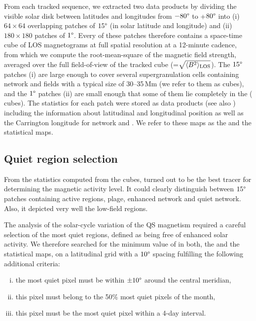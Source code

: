 \documentclass{aa}
\begin{document}
From each tracked sequence, we extracted two data products by dividing the visible solar disk  between latitudes and longitudes from $-80\degree$ to +$80\degree$ into (i) $64\times 64$  overlapping patches of $15\degree$ (in solar latitude and longitude)  and (ii) $180\times 180$ patches of $1\degree$.
Every of these patches therefore contains a space-time cube of LOS magnetograms at full spatial resolution at a 12-minute cadence,
from which we 
compute the 
root-mean-square of the magnetic field strength, averaged over the full field-of-view of the tracked cube (\brms{}=$\sqrt{\langle B^2\rangle_{\rm LOS}}$).
The $15\degree$ patches (i) are large enough to cover several supergranulation cells containing network and \IN{} fields \cite[]{2010LRSP....7....2R} with a typical size of 30--35\,Mm (we refer to them as \nw{} cubes), and the $1\degree$ patches (ii) are small enough that some of them lie completely in the \IN{} (\inw{} cubes). 
The statistics for each patch were stored as data products (see also ) including the information about 
latitudinal and longitudinal position as well as the Carrington 
longitude for network and \IN{}. We refer to these maps as the \nw{} and the \inw{} statistical maps.

\subsection{Quiet region selection\label{quietregion}}

From the 
statistics computed from the cubes, 
\brms{}
turned out to be the best tracer for determining the magnetic activity level. It could clearly distinguish between $15\degree$ patches containing active regions, plage, enhanced network and quiet network. Also, it depicted very well the low-field \IN{} regions.

The analysis of the solar-cycle variation of the 
QS
magnetism required a careful selection of the most quiet regions, defined as being free of enhanced solar activity. We therefore searched for the minimum value of \brms{} in both, the \nw{} and the \inw{} statistical maps, on a latitudinal grid with a $10\degree$ spacing fulfilling the following additional criteria:
\begin{enumerate}[(i)]
	\item\label{c1} the most quiet pixel must be within $\pm10\degree$ around the central meridian,
	\item\label{c2}  this pixel must belong to the 50\% most quiet pixels of the month,
	\item\label{c3}  this pixel must be the most quiet pixel within a 4-day interval.
\end{enumerate}
\end{document}
